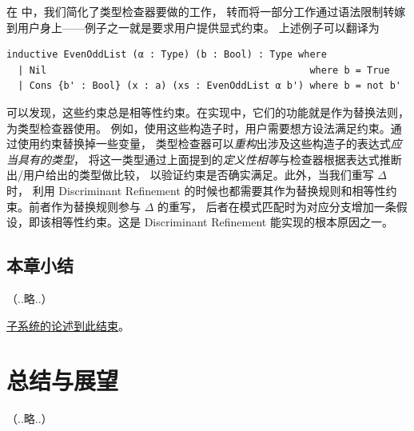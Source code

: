 \documentclass[a4paper, 11pt]{article}
\theoremstyle{remark}\newtheorem*{remark}{Remark}
\theoremstyle{definition}\newtheorem*{definition}{Definition}
\begin{document}
在 \Tigrisd 中，我们简化了类型检查器要做的工作，
转而将一部分工作通过语法限制转嫁到用户身上——例子之一就是要求用户提供显式约束。
上述例子可以翻译为

\begin{verbatim}
inductive EvenOddList (α : Type) (b : Bool) : Type where
  | Nil                                              where b = True
  | Cons {b' : Bool} (x : a) (xs : EvenOddList α b') where b = not b'
\end{verbatim}

可以发现，这些约束总是相等性约束。在实现中，它们的功能就是作为替换法则，为类型检查器使用。
例如，使用这些构造子时，用户需要想方设法满足约束。通过使用约束替换掉一些变量，
类型检查器可以\emph{重构}出涉及这些构造子的表达式\emph{应当具有的类型}，
将这一类型通过上面提到的\emph{定义性相等}与检查器根据表达式推断出/用户给出的类型做比较，
以验证约束是否确实满足。此外，当我们重写 $\Delta$ 时，
利用 Discriminant Refinement 的时候也都需要其作为替换规则和相等性约束。前者作为替换规则参与 $\Delta$ 的重写，
后者在模式匹配时为对应分支增加一条假设，即该相等性约束。这是 Discriminant Refinement 能实现的根本原因之一。

\subsection{本章小结}（..略..）

\vspace{1cm}

\begin{center}
\underline{\Tigrisd 子系统的论述到此结束}。
\end{center}
\pagebreak

\section{总结与展望}（..略..）

%
\end{document}
